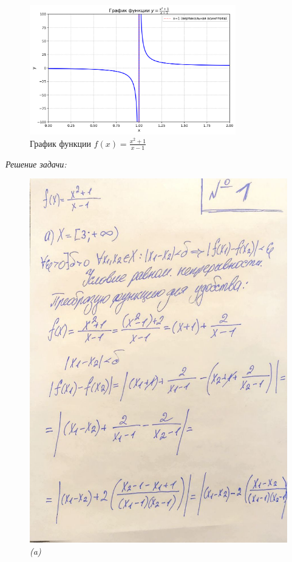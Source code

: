 \documentclass[a4paper,12pt]{article}
\begin{document}
\begin{figure}[h]
    \centering
    \includegraphics[width=0.8\textwidth]{../img/task1_graph.png}
    \caption{График функции \( f(x) = \frac{x^2 + 1}{x - 1} \)}
    \label{fig:graph}
\end{figure}

\emph{Решение задачи:}

\begin{figure}[H]
    \centering
    \includegraphics[width=0.8\linewidth]{../img/1_1.jpg}
    \caption{\emph{(a)}}
    \label{fig:part1}
\end{figure}
\end{document}
